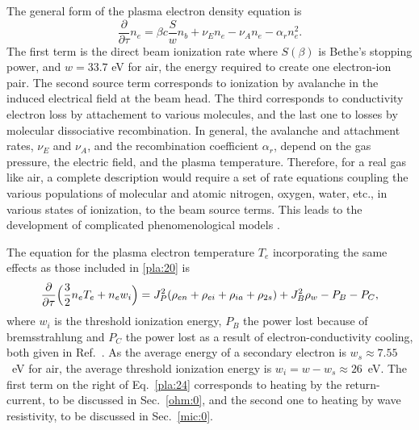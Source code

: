 \documentclass [12pt,a4paper,     ]{report} %
\begin{document}
   The general form of the plasma electron density equation is \cite{MCART1973-, IYYEN1989-}
%
\begin{equation}\label{pla:23} %
       \frac{\partial}{\partial\tau} n_e =  \beta c \frac{S}{w} n_b
                                         +  \nu_E n_e
                                         -  \nu_A n_e
                                         - \alpha_r n_e^2.
\end{equation}
%
The first term is the direct beam ionization rate where $S(\beta)$ is Bethe's stopping power, and $w = 33.7$ eV for air, the energy required to create one electron-ion pair.  The second source term corresponds to ionization by avalanche in the  induced electrical field at the beam head.  The third corresponds to conductivity electron loss by attachement to various molecules, and the last one to losses by molecular dissociative recombination.  In general, the avalanche and attachment rates, $\nu_E$ and $\nu_A$, and the recombination coefficient $\alpha_r$, depend on the gas pressure, the electric field, and the plasma temperature.  Therefore, for a real gas like air, a complete description would require a set of rate equations coupling the various populations of molecular and atomic nitrogen, oxygen, water, etc., in various states of ionization, to the beam source terms.  This leads to the development of complicated phenomenological models \cite{CARY-1980-, STRAS2003-}.


   The equation for the plasma electron temperature $T_e$ incorporating the same effects as those included in \eqref{pla:20} is \cite{IYYEN1989-}
%
\begin{equation}\label{pla:24} %
  \frac{\partial}{\partial\tau} \Bigl(\frac{3}{2}n_e T_e + n_e w_i \Bigr)
   = J_P^2(\rho_{en} + \rho_{ei} + \rho_{ia} + \rho_{2s})
   + J_B^2 \rho_{w} - P_B - P_C,
\end{equation}
%
where $w_i$ is the threshold ionization energy, $P_B$ the power lost because of brems\-strah\-lung and $P_C$ the power lost as a result of electron-conductivity cooling, both given in  Ref.~\cite{IYYEN1989-}.  As the average energy of a secondary electron is $w_s \approx 7.55$~eV for air, the average threshold ionization energy is $w_i = w - w_s \approx 26$~eV.  The first term on the right of Eq.~\eqref{pla:24} corresponds to heating by the return-current, to be discussed in Sec.~\ref{ohm:0}, and the second one to heating by wave resistivity, to be discussed in Sec.~\ref{mic:0}.
\end{document}
